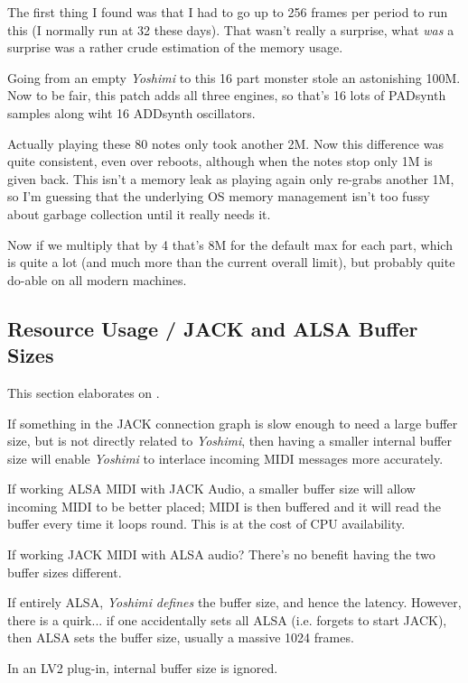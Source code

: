    The first thing I found was that I had to go up to 256 frames per period to
   run this (I normally run at 32 these days). That wasn't really a surprise,
   what \textsl{was} a surprise was a rather crude estimation of the memory
   usage.

   Going from an empty \textsl{Yoshimi} to this 16 part monster stole an
   astonishing 100M. Now to be fair, this patch adds all three engines, so
   that's 16 lots of PADsynth samples along wiht 16 ADDsynth oscillators.

   Actually playing these 80 notes only took another 2M. Now this difference
   was quite consistent, even over reboots, although when the notes stop only
   1M is given back. This isn't a memory leak as playing again only re-grabs
   another 1M, so I'm guessing that the underlying OS memory management isn't
   too fussy about garbage collection until it really needs it.

   Now if we multiply that by 4 that's 8M for the default max for each part,
   which is quite a lot (and much more than the current overall limit), but
   probably quite do-able on all modern machines.

\subsection{Resource Usage / JACK and ALSA Buffer Sizes}
\label{sec:resource_usage_buffer_sizes}

   This section elaborates on
   .

   If something in the JACK connection
   graph is slow enough to need a large buffer
   size, but is not directly related to \textsl{Yoshimi},
   then having a smaller internal
   buffer size will enable \textsl{Yoshimi}
   to interlace incoming MIDI messages more accurately.

   If working ALSA MIDI with JACK Audio, a smaller buffer size will allow
   incoming MIDI to be better placed; MIDI is then buffered and it will read
   the buffer every time it loops round. This is at the cost of CPU
   availability.

   If working JACK MIDI with ALSA audio? There's no benefit having the
   two buffer sizes different.

   If entirely ALSA, \textsl{Yoshimi} \textsl{defines}
   the buffer size, and hence the latency.
   However, there is a quirk... if one accidentally sets all ALSA
   (i.e. forgets to start JACK),
   then ALSA sets the buffer size, usually a massive 1024 frames.

   In an LV2 plug-in, internal buffer size is ignored.

